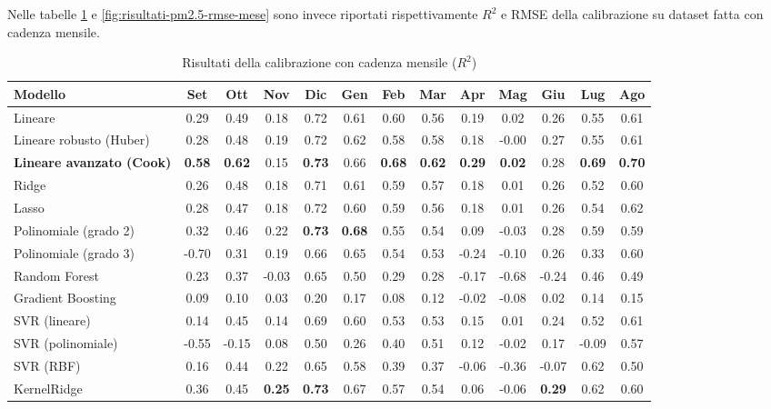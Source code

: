Nelle tabelle \ref{fig:risultati-pm2.5-mese} e \ref{fig:risultati-pm2.5-rmse-mese} sono invece riportati rispettivamente $R^2$ e RMSE della calibrazione su dataset  fatta con cadenza mensile.

\begin{table}[H]
    \tiny
    \centering
    \setlength{\tabcolsep}{4pt}
    \def\arraystretch{1.5}
    \begin{tabular}{|l|c|c|c|c|c|c|c|c|c|c|c|c|}
    \hline
        \textbf{Modello} & \textbf{Set} & \textbf{Ott} & \textbf{Nov} & \textbf{Dic} & \textbf{Gen} & \textbf{Feb} & \textbf{Mar} & \textbf{Apr} & \textbf{Mag} & \textbf{Giu} & \textbf{Lug} & \textbf{Ago} \\ \hline
        Lineare & 0.29 & 0.49 & 0.18 & 0.72 & 0.61 & 0.60 & 0.56 & 0.19 & 0.02 & 0.26 & 0.55 & 0.61 \\ \hline
        Lineare robusto (Huber) & 0.28 & 0.48 & 0.19 & 0.72 & 0.62 & 0.58 & 0.58 & 0.18 & -0.00 & 0.27 & 0.55 & 0.61 \\ \hline
        \textbf{Lineare avanzato (Cook)} & \textbf{0.58} & \textbf{0.62} & 0.15 & \textbf{0.73} & 0.66 & \textbf{0.68} & \textbf{0.62} & \textbf{0.29} & \textbf{0.02} & 0.28 & \textbf{0.69} & \textbf{0.70} \\ \hline
        Ridge & 0.26 & 0.48 & 0.18 & 0.71 & 0.61 & 0.59 & 0.57 & 0.18 & 0.01 & 0.26 & 0.52 & 0.60 \\ \hline
        Lasso & 0.28 & 0.47 & 0.18 & 0.72 & 0.60 & 0.59 & 0.56 & 0.18 & 0.01 & 0.26 & 0.54 & 0.62 \\ \hline
        Polinomiale (grado 2) & 0.32 & 0.46 & 0.22 & \textbf{0.73} & \textbf{0.68} & 0.55 & 0.54 & 0.09 & -0.03 & 0.28 & 0.59 & 0.59 \\ \hline
        Polinomiale (grado 3) & -0.70 & 0.31 & 0.19 & 0.66 & 0.65 & 0.54 & 0.53 & -0.24 & -0.10 & 0.26 & 0.33 & 0.60 \\ \hline
        Random Forest & 0.23 & 0.37 & -0.03 & 0.65 & 0.50 & 0.29 & 0.28 & -0.17 & -0.68 & -0.24 & 0.46 & 0.49 \\ \hline
        Gradient Boosting & 0.09 & 0.10 & 0.03 & 0.20 & 0.17 & 0.08 & 0.12 & -0.02 & -0.08 & 0.02 & 0.14 & 0.15 \\ \hline
        SVR (lineare) & 0.14 & 0.45 & 0.14 & 0.69 & 0.60 & 0.53 & 0.53 & 0.15 & 0.01 & 0.24 & 0.52 & 0.61 \\ \hline
        SVR (polinomiale) & -0.55 & -0.15 & 0.08 & 0.50 & 0.26 & 0.40 & 0.51 & 0.12 & -0.02 & 0.17 & -0.09 & 0.57 \\ \hline
        SVR (RBF) & 0.16 & 0.44 & 0.22 & 0.65 & 0.58 & 0.39 & 0.37 & -0.06 & -0.36 & -0.07 & 0.62 & 0.50 \\ \hline
        KernelRidge & 0.36 & 0.45 & \textbf{0.25} & \textbf{0.73} & 0.67 & 0.57 & 0.54 & 0.06 & -0.06 & \textbf{0.29} & 0.62 & 0.60 \\ \hline
    \end{tabular}
    \captionsetup{justification=centering}
    \caption{Risultati della calibrazione  con cadenza mensile ($R^2$)}
    \label{fig:risultati-pm2.5-mese}
\end{table}

